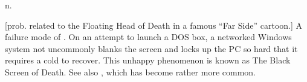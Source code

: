  n.

[prob. related to the Floating Head of Death in a famous ``Far Side'' cartoon.]
A failure mode of . On an attempt to launch a DOS
box, a networked Windows system not uncommonly blanks the screen and locks up
the PC so hard that it requires a cold  to recover. This unhappy
phenomenon is known as The Black Screen of Death. See also , which has become rather more common.

